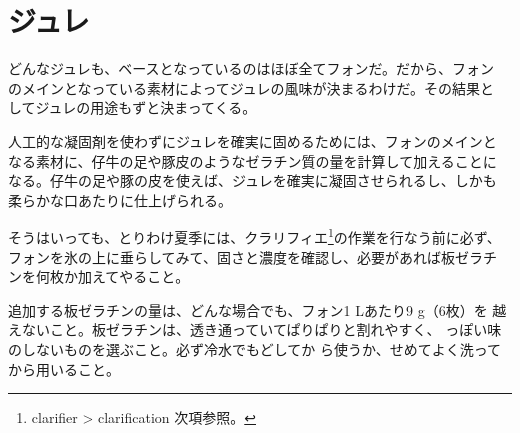 \hypertarget{gelees-diverses}{%
\section{ジュレ}\label{gelees-diverses}}


 

どんなジュレも、ベースとなっているのはほぼ全てフォンだ。だから、フォン
のメインとなっている素材によってジュレの風味が決まるわけだ。その結果と
してジュレの用途もずと決まってくる。

人工的な凝固剤を使わずにジュレを確実に固めるためには、フォンのメインと
なる素材に、仔牛の足や豚皮のようなゼラチン質の量を計算して加えることに
なる。仔牛の足や豚の皮を使えば、ジュレを確実に凝固させられるし、しかも
柔らかな口あたりに仕上げられる。

そうはいっても、とりわけ夏季には、クラリフィエ\footnote{clarifier
  \textgreater{} clarification 次項参照。}の作業を行なう前に必ず、
フォンを氷の上に垂らしてみて、固さと濃度を確認し、必要があれば板ゼラチ
ンを何枚か加えてやること。

追加する板ゼラチンの量は、どんな場合でも、フォン1 Lあたり9 g（6枚）を
越えないこと。板ゼラチンは、透き通っていてぱりぱりと割れやすく、
っぽい味のしないものを選ぶこと。必ず冷水でもどしてか
ら使うか、せめてよく洗ってから用いること。

